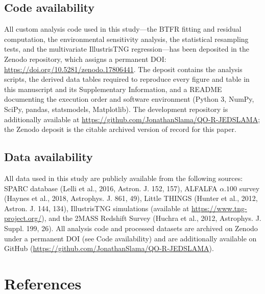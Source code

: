 \documentclass[11pt,a4paper]{article}
\begin{document}
\subsection*{Code availability}
All custom analysis code used in this study---the BTFR fitting and residual computation, the environmental sensitivity analysis, the statistical resampling tests, and the multivariate IllustrisTNG regression---has been deposited in the Zenodo repository, which assigns a permanent DOI: \url{https://doi.org/10.5281/zenodo.17806441}. The deposit contains the analysis scripts, the derived data tables required to reproduce every figure and table in this manuscript and its Supplementary Information, and a README documenting the execution order and software environment (Python 3, NumPy, SciPy, pandas, statsmodels, Matplotlib). The development repository is additionally available at \url{https://github.com/JonathanSlama/QO-R-JEDSLAMA}; the Zenodo deposit is the citable archived version of record for this paper.

\subsection*{Data availability}
All data used in this study are publicly available from the following sources: SPARC database (Lelli et al., 2016, Astron. J. 152, 157), ALFALFA $\alpha.100$ survey (Haynes et al., 2018, Astrophys. J. 861, 49), Little THINGS (Hunter et al., 2012, Astron. J. 144, 134), IllustrisTNG simulations (available at \url{https://www.tng-project.org/}), and the 2MASS Redshift Survey (Huchra et al., 2012, Astrophys. J. Suppl. 199, 26). All analysis code and processed datasets are archived on Zenodo under a permanent DOI (see Code availability) and are additionally available on GitHub (\url{https://github.com/JonathanSlama/QO-R-JEDSLAMA}).


\section*{References}
\end{document}
